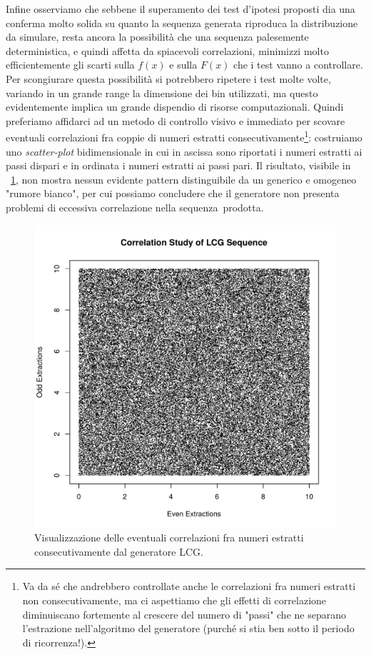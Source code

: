 \noindent Infine osserviamo che sebbene il superamento dei test d'ipotesi proposti dia una conferma molto solida su quanto la sequenza generata riproduca la distribuzione da simulare, resta ancora la possibilità che una sequenza palesemente deterministica, e quindi affetta da spiacevoli correlazioni, minimizzi molto efficientemente gli scarti sulla $f(x)$ e sulla $F(x)$ che i test vanno a controllare. Per scongiurare questa possibilità si potrebbero ripetere i test molte volte, variando in un grande range la dimensione dei bin utilizzati, ma questo evidentemente implica un grande dispendio di risorse computazionali. Quindi preferiamo affidarci ad un metodo di controllo visivo e immediato per scovare eventuali correlazioni fra coppie di numeri estratti consecutivamente\footnote{Va da sé che andrebbero controllate anche le correlazioni fra numeri estratti non consecutivamente, ma ci aspettiamo che gli effetti di correlazione diminuiscano fortemente al crescere del numero di "passi" che ne separano l'estrazione nell'algoritmo del generatore (purché si stia ben sotto il periodo di ricorrenza!).}: costruiamo uno \emph{scatter-plot} bidimensionale in cui in ascissa sono riportati i numeri estratti ai passi dispari e in ordinata i numeri estratti ai passi pari. Il risultato, visibile in \figurename~\ref{fig:SimulatedWhiteNoise}, non mostra nessun evidente pattern distinguibile da un generico e omogeneo "rumore bianco", per cui possiamo concludere che il generatore non presenta problemi di eccessiva correlazione nella sequenza~prodotta.

\begin{figure}[h!]
	\centering
	\includegraphics[width=0.55\linewidth, trim={0 0.5cm 0 0cm}, clip]{Immagini/CorrelationStudy}
	\caption{Visualizzazione delle eventuali correlazioni fra numeri estratti consecutivamente dal generatore LCG.}
	\label{fig:SimulatedWhiteNoise}
\end{figure}


